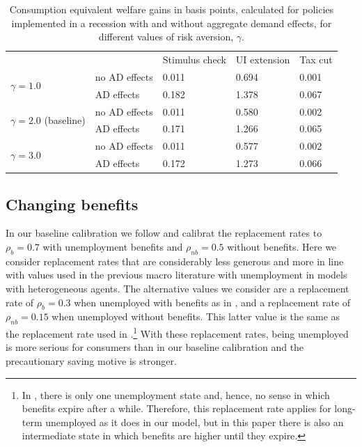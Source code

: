 \documentclass[../HAFiscal]{subfiles}
\begin{document}
\begin{table}[]
	\begin{center}
		\begin{tabular}{@{}lllll@{}}
			\toprule
			&                    & Stimulus check & UI extension & Tax cut \\ \cmidrule(l){1-5} 
			\multirow{2}{*}{$\gamma = 1.0$}            	& no AD effects & 0.011          & 0.694        & 0.001   \\
			& AD effects    & 0.182          & 1.378        & 0.067   \\
			\multirow{2}{*}{$\gamma = 2.0$ (baseline)} 	& no AD effects & 0.011          & 0.580        & 0.002   \\
			& AD effects    & 0.171          & 1.266        & 0.065   \\
			\multirow{2}{*}{$\gamma = 3.0$}            	& no AD effects & 0.011          & 0.577        & 0.002   \\
			& AD effects    & 0.172          & 1.273        & 0.066   \\ \cmidrule(l){1-5} 
		\end{tabular}
		\caption{Consumption equivalent welfare gains in basis points, calculated for policies implemented in a recession with and without aggregate demand effects, for different values of risk aversion, $\gamma$.}
		\label{tab:robustness_gamma_results}
	\end{center}
\end{table}


\subsection{Changing benefits} 
\label{sec:robust_benefits} 

In our baseline calibration we follow \cite{rothstein2017scraping} and calibrat the replacement rates to $\rho_b=0.7$ with unemployment benefits and $\rho_{nb}=0.5$ without benefits. Here we consider replacement rates that are considerably less generous and more in line with values used in the previous macro literature with unemployment in models with heterogeneous agents. The alternative values we consider are a replacement rate of $\rho_{b}=0.3$ when unemployed with benefits as in \cite{carroll2020modeling}, and a replacement rate of $\rho_{nb}=0.15$ when unemployed without benefits. This latter value is the same as the replacement rate used in \cite{den2010computational}.\footnote{In \cite{den2010computational}, there is only one unemployment state and, hence, no sense in which benefits expire after a while. Therefore, this replacement rate applies for long-term unemployed as it does in our model, but in this paper there is also an intermediate state in which benefits are higher until they expire.} With these replacement rates, being unemployed is more serious for consumers than in our baseline calibration and the precautionary saving motive is stronger. 
\end{document}
